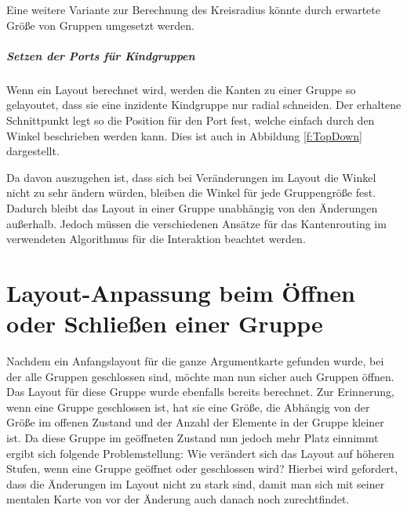Eine weitere Variante zur Berechnung des Kreisradius könnte durch erwartete Größe von Gruppen umgesetzt werden.

		
							



\subparagraph{Setzen der Ports für Kindgruppen}
Wenn ein Layout berechnet wird, werden die Kanten zu einer Gruppe so gelayoutet, dass sie eine inzidente Kindgruppe nur radial schneiden.
Der erhaltene Schnittpunkt legt so die Position für den Port fest, welche einfach durch den Winkel beschrieben werden kann. 
Dies ist auch in Abbildung  \ref{f:TopDown} dargestellt.

Da davon auszugehen ist, dass sich bei Veränderungen im Layout die Winkel nicht zu sehr ändern würden, bleiben die Winkel für jede Gruppengröße fest.
Dadurch bleibt das Layout in einer Gruppe unabhängig von den Änderungen außerhalb. 
Jedoch müssen die verschiedenen Ansätze für das Kantenrouting im verwendeten Algorithmus für die Interaktion beachtet werden.




\section{Layout-Anpassung beim Öffnen oder Schließen einer Gruppe}
Nachdem ein Anfangslayout für die ganze Argumentkarte gefunden wurde, bei der alle Gruppen geschlossen sind, möchte man nun sicher auch Gruppen öffnen. 
Das Layout für diese Gruppe wurde ebenfalls bereits berechnet. Zur Erinnerung, wenn eine Gruppe geschlossen ist, hat sie eine Größe, 
die Abhängig von der Größe im offenen Zustand und der Anzahl der Elemente in der Gruppe kleiner ist. 
Da diese Gruppe im geöffneten Zustand nun jedoch mehr Platz einnimmt ergibt sich folgende Problemstellung:
Wie verändert sich das Layout auf höheren Stufen, wenn eine Gruppe geöffnet oder geschlossen wird? 
Hierbei wird gefordert, dass die Änderungen im Layout nicht zu stark sind, damit man sich mit seiner mentalen Karte von vor der Änderung auch danach noch zurechtfindet.

